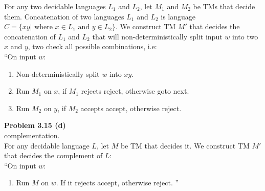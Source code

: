 \documentclass{article}
\newcommand\curl[1]{\{#1\}}
\newcommand{\problem}[1]{\large{\textbf{Problem #1}}\\}
\begin{document}
For any two decidable languages $L_1$ and $L_2$, let $M_1$ and $M_2$ be TMs that decide them.
Concatenation of two languages $L_1$ and $L_2$ is language $C = \curl{xy | \text{ where 
    } x \in L_1 \text{ and } y \in L_2}$.
We construct TM $M'$ that decides the concatenation of $L_1$ and $L_2$ that will non-deterministically 
split input $w$ into two $x$ and $y$, two check all possible combinations, i.e:\\

``On input $w$:
\begin{enumerate}[1., leftmargin = 1.5cm]
\itemsep0em
\item Non-deterministically split $w$ into $xy$.
\item Run $M_1$ on $x$, if $M_1$ rejects reject, otherwise goto next.
\item Run $M_2$ on $y$, if $M_2$ accepts accept, otherwise reject.
\end{enumerate}


\problem{3.15  (d)}
complementation.\\

For any decidable language $L$, let $M$ be TM that decides it.
We construct TM $M'$ that decides the complement  of $L$: \\

``On input $w$:
\begin{enumerate}[1., leftmargin = 1.5cm]
\itemsep0em
\item Run $M$ on $w$. If it rejects accept, otherwise reject. ''
\end{enumerate}
\end{document}
